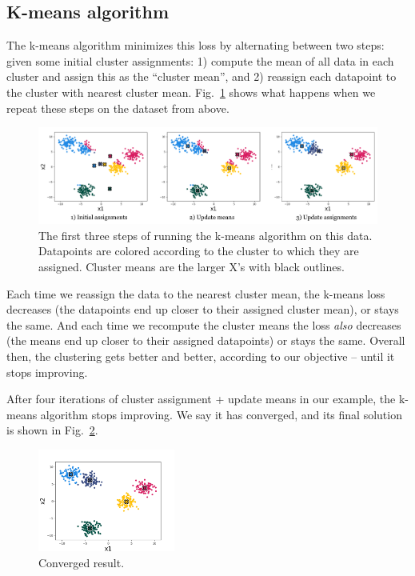 \subsection{K-means algorithm}

The k-means algorithm minimizes this loss by alternating between two
steps: given some initial cluster assignments: 1) compute the mean of
all data in each cluster and assign this as the ``cluster mean'', and 2)
reassign each datapoint to the cluster with nearest cluster
mean. Fig.~\ref{fig:kmeans_iters} shows what happens when we repeat
these steps on the dataset from above.

\begin{figure}[h]
  \centering
  \includegraphics[width=1.0\textwidth]{figures/kmeans_iters.png}
  \caption{The first three steps of running the k-means algorithm on
    this data. Datapoints are colored according to the cluster to
    which they are assigned. Cluster means are the larger X's with
    black outlines.}
  \label{fig:kmeans_iters}
\end{figure}

Each time we reassign the data to the nearest cluster mean, the
k-means loss decreases (the datapoints end up closer to their assigned
cluster mean), or stays the same.  And each time we recompute the
cluster means the loss \textit{also} decreases (the means end up
closer to their assigned datapoints) or stays the same. Overall then,
the clustering gets better and better, according to our objective --
until it stops improving.

After four iterations of cluster assignment + update means in our example,
the k-means algorithm stops improving. We say it has converged,
and its final solution is shown in Fig.~\ref{fig:kmeans_converged}.
\begin{figure}[h]
  \centering
  \includegraphics[width=0.4\textwidth]{figures/kmeans_fig2_converged.png}
  \caption{Converged result.}
  \label{fig:kmeans_converged}
\end{figure}

